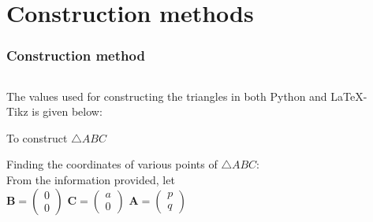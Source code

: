 \documentclass{beamer}
\renewcommand{\vec}[1]{\mathbf{#1}}
\begin{document}
\section*{Construction methods}
\begin{frame}[fragile]
\footnotesize
\frametitle{Construction method}
\begin{columns}
\begin{column}{0.5\textwidth}
The values used for constructing the triangles in both Python and \LaTeX{}-Tikz is given below:
\begin{table}[ht]
    \begin{center}
    	
  \caption{To construct $\triangle ABC$}
   \label{table:table1}
   \end{center}	
\end{table}

Finding the coordinates of various points of  $\triangle ABC$:\\
From the information provided, let\\
    \quad $ \vec{B}= \begin{pmatrix}0\\0\end{pmatrix}$
    \quad $\vec{C}=\begin{pmatrix}a\\0\end{pmatrix}$
    \quad $\vec{A}=\begin{pmatrix}p\\q\end{pmatrix}$
 \end{column}
\begin{column}{0.5\textwidth}   
   

\end{column}
\end{columns}
\end{frame}
\end{document}
